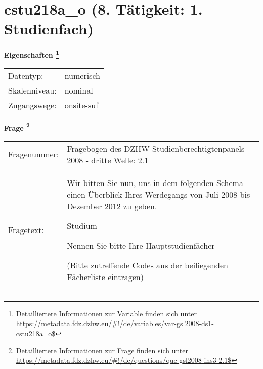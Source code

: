 
    \setcounter{footnote}{0}

    \vspace*{-1.8cm}
	\section{cstu218a\_o (8. Tätigkeit: 1. Studienfach)}
	\label{section:cstu218a_o}



    \vspace*{0.5cm}
    \noindent\textbf{Eigenschaften
	\footnote{Detailliertere Informationen zur Variable finden sich unter
		\url{https://metadata.fdz.dzhw.eu/\#!/de/variables/var-gsl2008-ds1-cstu218a_o$}}}\\
	\begin{tabularx}{\hsize}{@{}lX}
	Datentyp: & numerisch \\
	Skalenniveau: & nominal \\
	Zugangswege: &
	  onsite-suf
 \\
    \end{tabularx}



				\vspace*{0.5cm}
                \noindent\textbf{Frage
	                \footnote{Detailliertere Informationen zur Frage finden sich unter
		              \url{https://metadata.fdz.dzhw.eu/\#!/de/questions/que-gsl2008-ins3-2.1$}}}\\
				\begin{tabularx}{\hsize}{@{}lX}
					Fragenummer: &
					  Fragebogen des DZHW-Studienberechtigtenpanels 2008 - dritte Welle:
					  2.1
 \\
					Fragetext: & Wir bitten Sie nun, uns in dem folgenden Schema einen Überblick Ihres Werdegangs von Juli 2008 bis Dezember 2012 zu geben.\par  Studium\par  Nennen Sie bitte Ihre Hauptstudienfächer\par  (Bitte zutreffende Codes aus der beiliegenden Fächerliste eintragen) \\
				\end{tabularx}





